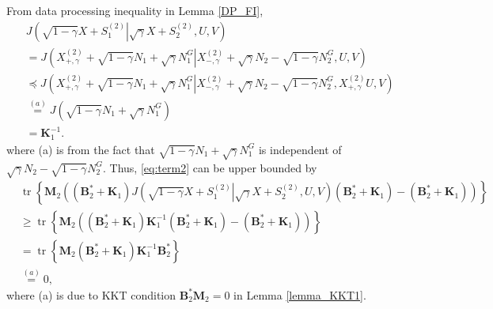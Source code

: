 \documentclass[journal,final, onecolumn]{IEEEtran}
\DeclareMathOperator{\tr}{tr}
\begin{document}
From data processing inequality in Lemma \ref{DP_FI},
\begin{align}
& J   \left(  \sqrt{1-\gamma}X+S^{(2)}_{1} \left|   \sqrt{\gamma}X+S^{(2)}_{2}, U,V \right. \right)\nonumber \\
&= J \left(      X^{(2)}_{+,\gamma}+\sqrt{1-\gamma}N_{1} + \sqrt{\gamma} N_{1}^{G}      \left|   X^{(2)}_{-,\gamma}+\sqrt{\gamma}N_{2} - \sqrt{1-\gamma} N_{2}^{G},       U,V    \right.  \right) \\
&\preceq J\left(      X^{(2)}_{+,\gamma}+\sqrt{1-\gamma}N_{1} + \sqrt{\gamma} N_{1}^{G}      \left|   X^{(2)}_{-,\gamma}+\sqrt{\gamma}N_{2} - \sqrt{1-\gamma} N_{2}^{G}, X^{(2)}_{+,\gamma}      U,V    \right.  \right) \\
& \overset{(a)} = J \left(       \sqrt{1-\gamma}N_{1} + \sqrt{\gamma} N_{1}^{G}       \right)\\
&=\boldsymbol{K}_{1}^{-1}.
\end{align}
where (a) is from the fact that $\sqrt{1-\gamma}N_{1} + \sqrt{\gamma} N_{1}^{G}$ is independent of $\sqrt{\gamma}N_{2} - \sqrt{1-\gamma} N_{2}^{G}$.  Thus, \eqref{eq:term2} can be upper bounded by
\begin{align}
& \tr \left\{     \boldsymbol{M}_2 \left(  \left(  \boldsymbol{B}_2^{*} + \boldsymbol{K}_{1}     \right) J   \left(  \sqrt{1-\gamma}X+S^{(2)}_{1} \left|   \sqrt{\gamma}X+S^{(2)}_{2}, U,V \right. \right)  \left(  \boldsymbol{B}_2^{*} + \boldsymbol{K}_{1}     \right)  -\left(  \boldsymbol{B}_2^{*} + \boldsymbol{K}_{1}     \right)\right)     \right\} \nonumber \\
& \geq \tr \left\{     \boldsymbol{M}_2 \left(  \left(  \boldsymbol{B}_2^{*} + \boldsymbol{K}_{1}     \right) \boldsymbol{K}_{1}^{-1}  \left(  \boldsymbol{B}_2^{*} + \boldsymbol{K}_{1}     \right)  -\left(  \boldsymbol{B}_2^{*} + \boldsymbol{K}_{1}     \right)\right)     \right\} \\
& = \tr \left\{     \boldsymbol{M}_2   \left(  \boldsymbol{B}_2^{*} + \boldsymbol{K}_{1}     \right) \boldsymbol{K}_{1}^{-1}  \boldsymbol{B}_2^{*}          \right\} \\
&\overset{(a)}=0,\label{term2}
\end{align}
where (a) is due to KKT condition $\boldsymbol{B}_{2}^{*}\boldsymbol{M}_{2} =0$ in Lemma \ref{lemma_KKT1}.
\end{document}
